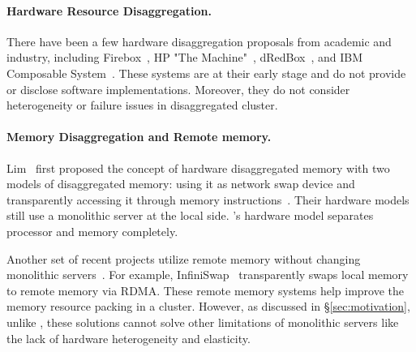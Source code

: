 \documentclass[10pt,times,twocolumn]{z2-article}
\begin{document}
{{{{{{{\paragraph{Hardware Resource Disaggregation.}
There have been a few hardware disaggregation proposals from academic and industry,
including Firebox~\cite{FireBox-FASTKeynote}, HP "The Machine"~\cite{HP-TheMachine,HP-MemoryOS}, dRedBox~\cite{dRedBox-DATE},
and IBM Composable System~\cite{IBM-Composable}.
These systems are at their early stage and do not provide or disclose software implementations.
Moreover, they do not consider heterogeneity or failure issues in disaggregated cluster.

\paragraph{Memory Disaggregation and Remote memory.}
Lim \etal\ first proposed the concept of hardware disaggregated memory
with two models of disaggregated memory: using it as network swap device 
and transparently accessing it through memory instructions~\cite{Lim09-disaggregate,Lim12-HPCA}.
Their hardware models still use a monolithic server at the local side. 
\lego's hardware model separates processor and memory completely. %

Another set of recent projects utilize remote memory without changing 
monolithic servers~\cite{Dragojevic14-FaRM,Nelson15-ATC,remote-region-atc18,GU17-NSDI,Novakovic16-SOCC,hotpot-socc17}.
For example, InfiniSwap~\cite{GU17-NSDI} transparently swaps local memory to remote memory via RDMA.
These remote memory systems help improve the memory resource packing in a cluster.
However, as discussed in \S\ref{sec:motivation}, unlike \lego, these solutions cannot solve other limitations 
of monolithic servers like the lack of hardware heterogeneity and elasticity. 

}}}}}}}
\end{document}
